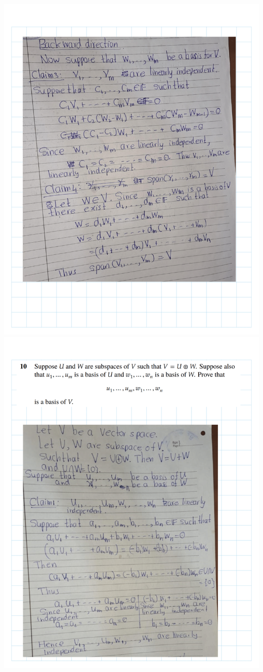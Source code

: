 \documentclass[
]{book}
\theoremstyle{definition}
\theoremstyle{definition}
\theoremstyle{definition}
\theoremstyle{definition}
\theoremstyle{remark}
\begin{document}
\includegraphics{fig/Ex 2B and 2C/EX2B (21).png}
\includegraphics{fig/Ex 2B and 2C/EX2B (22).png}
\end{document}
